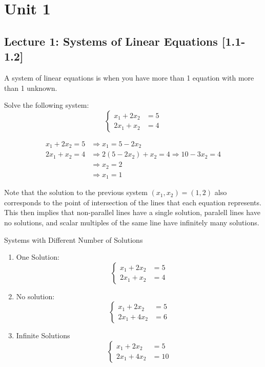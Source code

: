 \section{Unit 1}
\subsection{Lecture 1: Systems of Linear Equations [1.1-1.2]}

A system of linear equations is when you have more than 1 equation with more than 1 unknown.

\begin{example}{}{}
    Solve the following system:
    \[
        \begin{cases}
            x_1 + 2x_2 &= 5 \\
            2x_1 + x_2 &= 4
        \end{cases}
    \]
    \begin{solution}
        \begin{align*}
            x_1 + 2x_2 = 5 &\Rightarrow x_1 = 5-2x_2 \\
            2x_1 + x_2 = 4 &\Rightarrow 2(5-2x_2) + x_2 = 4 \Rightarrow 10-3x_2=4 \\ 
            &\Rightarrow x_2=2 \\
            &\Rightarrow x_1 = 1
        \end{align*}
    \end{solution}
\end{example}

Note that the solution to the previous system $(x_1, x_2) = (1, 2)$ also corresponds to the point of intersection of the lines that each equation represents. This then implies that non-parallel lines have a single solution, paralell lines have no solutions, and scalar multiples of the same line have infinitely many solutions.

\begin{example}{Systems with Different Number of Solutions}{}
    \begin{enumerate}
        \item One Solution:
        \[
            \begin{cases}
                x_1 + 2x_2 &= 5 \\
                2x_1 + x_2 &= 4
            \end{cases} 
        \]

        \item No solution:
        \[
            \begin{cases}
                x_1 + 2x_2 &= 5 \\
                2x_1 + 4x_2 &= 6
            \end{cases}
        \]

        \item Infinite Solutions
        \[
            \begin{cases}
                x_1 + 2x_2 &= 5 \\
                2x_1 + 4x_2 &= 10
            \end{cases}
        \]
    \end{enumerate}
\end{example}

